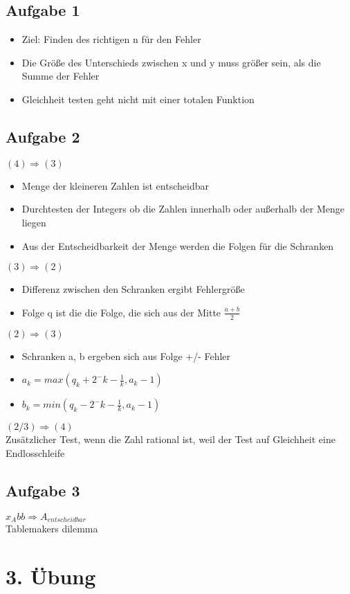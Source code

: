 \documentclass[ngerman]{scrartcl}
\begin{document}
\subsection*{Aufgabe 1}
\begin{itemize}
  \item Ziel: Finden des richtigen n für den Fehler
  \item Die Größe des Unterschieds zwischen x und y muss größer sein, als die Summe der Fehler
  \item Gleichheit testen geht nicht mit einer totalen Funktion
\end{itemize}
\subsection*{Aufgabe 2}
$ (4) \Rightarrow (3) $
\begin{itemize}
  \item Menge der kleineren Zahlen ist entscheidbar
  \item Durchtesten der Integers ob die Zahlen innerhalb oder außerhalb der Menge liegen  
  \item Aus der Entscheidbarkeit der Menge werden die Folgen für die Schranken
\end{itemize}
$ (3) \Rightarrow (2) $
\begin{itemize}
  \item Differenz zwischen den Schranken ergibt Fehlergröße
  \item Folge q ist die die Folge, die sich aus der Mitte $ \frac{a + b}{2} $
\end{itemize}
$ (2) \Rightarrow (3) $
\begin{itemize}
  \item Schranken a, b ergeben sich aus Folge +/- Fehler
  \item $ a_k = max(q_k + 2^-k - \frac{1}{k}, a_k-1) $
  \item $ b_k = min(q_k - 2^-k - \frac{1}{k}, a_k-1) $
\end{itemize}
$ (2/3) \Rightarrow (4) $ \\
Zusätzlicher Test, wenn die Zahl rational ist, weil der Test auf Gleichheit eine Endlosschleife

\subsection*{Aufgabe 3}
$ x_A bb \Rightarrow A_{entscheidbar} $\\
Tablemakers dilemma

\section{3. Übung}
\end{document}
